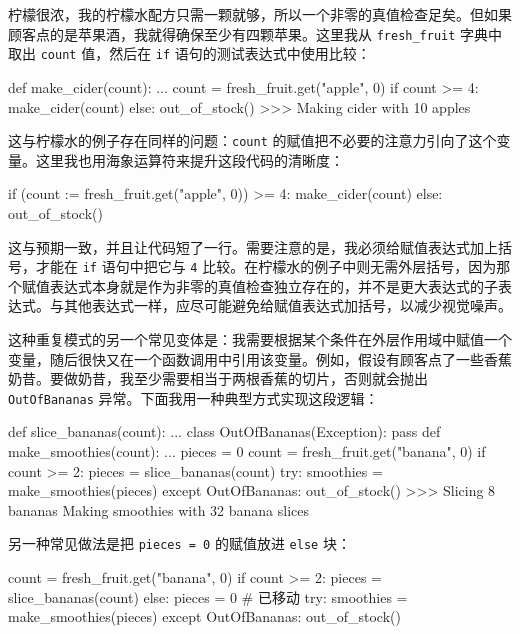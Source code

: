 柠檬很浓，我的柠檬水配方只需一颗就够，所以一个非零的真值检查足矣。但如果顾客点的是苹果酒，我就得确保至少有四颗苹果。这里我从 \texttt{fresh\_fruit} 字典中取出 \texttt{count} 值，然后在 \texttt{if} 语句的测试表达式中使用比较：

\begin{codebox}[python]
def make_cider(count):
    ...
count = fresh_fruit.get("apple", 0)
if count >= 4:
    make_cider(count)
else:
    out_of_stock()
>>>
Making cider with 10 apples
\end{codebox}

这与柠檬水的例子存在同样的问题：\texttt{count} 的赋值把不必要的注意力引向了这个变量。这里我也用海象运算符来提升这段代码的清晰度：

\begin{codebox}[python]
if (count := fresh_fruit.get("apple", 0)) >= 4:
    make_cider(count)
else:
    out_of_stock()
\end{codebox}

这与预期一致，并且让代码短了一行。需要注意的是，我必须给赋值表达式加上括号，才能在 \texttt{if} 语句中把它与 \texttt{4} 比较。在柠檬水的例子中则无需外层括号，因为那个赋值表达式本身就是作为非零的真值检查独立存在的，并不是更大表达式的子表达式。与其他表达式一样，应尽可能避免给赋值表达式加括号，以减少视觉噪声。

这种重复模式的另一个常见变体是：我需要根据某个条件在外层作用域中赋值一个变量，随后很快又在一个函数调用中引用该变量。例如，假设有顾客点了一些香蕉奶昔。要做奶昔，我至少需要相当于两根香蕉的切片，否则就会抛出 \texttt{OutOfBananas} 异常。下面我用一种典型方式实现这段逻辑：

\begin{codebox}[python]
def slice_bananas(count):
    ...
class OutOfBananas(Exception):
    pass
def make_smoothies(count):
    ...
pieces = 0
count = fresh_fruit.get("banana", 0)
if count >= 2:
    pieces = slice_bananas(count)
try:
    smoothies = make_smoothies(pieces)
except OutOfBananas:
    out_of_stock()
>>>
Slicing 8 bananas
Making smoothies with 32 banana slices
\end{codebox}

另一种常见做法是把 \texttt{pieces = 0} 的赋值放进 \texttt{else} 块：

\begin{codebox}[python]
count = fresh_fruit.get("banana", 0)
if count >= 2:
    pieces = slice_bananas(count)
else:
    pieces = 0  # 已移动
try:
    smoothies = make_smoothies(pieces)
except OutOfBananas:
    out_of_stock()
\end{codebox}

